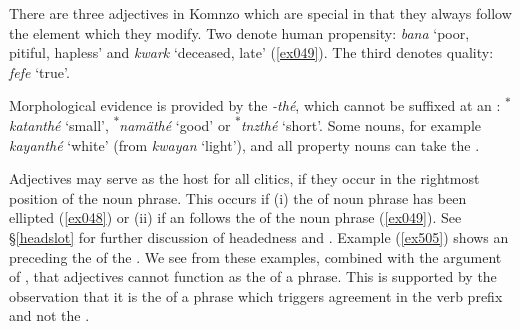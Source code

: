There are three adjectives in Komnzo which are special in that they always follow the element which they modify. Two denote human propensity: \emph{bana} `poor, pitiful, hapless' and \emph{kwark} `deceased, late' (\ref{ex049}). The third denotes quality: \emph{fefe} `true'.%

Morphological evidence is provided by the  \emph{-thé}, which cannot be suffixed at an : \textsuperscript{$\ast$}\emph{katanthé} `small', \textsuperscript{$\ast$}\emph{namäthé} `good' or \textsuperscript{$\ast$}\emph{tnzthé} `short'. Some nouns, for example \emph{kayanthé} `white' (from \emph{kwayan} `light'), and all property nouns can take the .%

Adjectives may serve as the host for all  clitics, if they occur in the rightmost position of the noun phrase. This occurs if (i) the  of noun phrase has been ellipted (\ref{ex048}) or (ii) if an  follows the  of the noun phrase (\ref{ex049}). See \S{}\ref{headslot} for further discussion of headedness and . Example (\ref{ex505}) shows an  preceding the  of the . We see from these examples, combined with the argument of , that adjectives cannot function as the  of a phrase. This is supported by the observation that it is the  of a phrase which triggers agreement in the verb prefix and not the .


